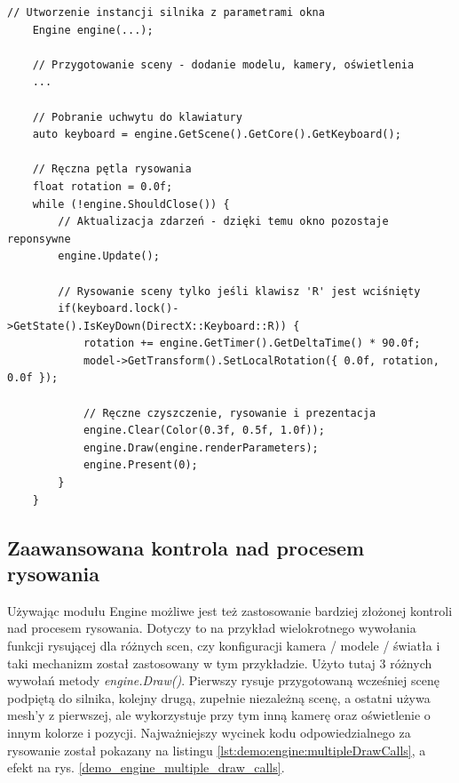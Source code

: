 \begin{lstlisting}[caption={Kod przykładowego programu manualnej kontroli przepływu działania programu w module silnika.}, label={lst:demo:engine:manualDrawingLoop}]
	// Utworzenie instancji silnika z parametrami okna
	Engine engine(...);
	
	// Przygotowanie sceny - dodanie modelu, kamery, oświetlenia
	...
	
	// Pobranie uchwytu do klawiatury
	auto keyboard = engine.GetScene().GetCore().GetKeyboard();
	
	// Ręczna pętla rysowania
	float rotation = 0.0f;
	while (!engine.ShouldClose()) {
		// Aktualizacja zdarzeń - dzięki temu okno pozostaje reponsywne
		engine.Update();
		
		// Rysowanie sceny tylko jeśli klawisz 'R' jest wciśnięty
		if(keyboard.lock()->GetState().IsKeyDown(DirectX::Keyboard::R)) {
			rotation += engine.GetTimer().GetDeltaTime() * 90.0f;
			model->GetTransform().SetLocalRotation({ 0.0f, rotation, 0.0f });
			
			// Ręczne czyszczenie, rysowanie i prezentacja
			engine.Clear(Color(0.3f, 0.5f, 1.0f));
			engine.Draw(engine.renderParameters);
			engine.Present(0);
		}
	}
\end{lstlisting}

\subsection{Zaawansowana kontrola nad procesem rysowania}
Używając modułu Engine możliwe jest też zastosowanie bardziej złożonej kontroli nad procesem rysowania. Dotyczy to na przykład wielokrotnego wywołania funkcji rysującej dla różnych scen, czy konfiguracji kamera / modele / światła i taki mechanizm został zastosowany w tym przykładzie. Użyto tutaj 3 różnych wywołań metody \textit{engine.Draw()}. Pierwszy rysuje przygotowaną wcześniej scenę podpiętą do silnika, kolejny drugą, zupełnie niezależną scenę, a ostatni używa mesh'y z pierwszej, ale wykorzystuje przy tym inną kamerę oraz oświetlenie o innym kolorze i pozycji. Najważniejszy wycinek kodu odpowiedzialnego za rysowanie został pokazany na listingu \ref{lst:demo:engine:multipleDrawCalls}, a efekt na rys.  \ref{demo_engine_multiple_draw_calls}.

\vfill
\clearpage

